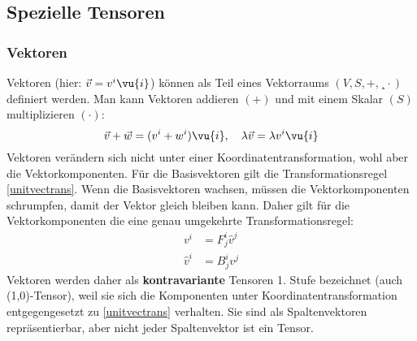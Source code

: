 	\subsection{Spezielle Tensoren}
	\subsubsection{Vektoren}
	Vektoren (hier: $\vec{v}=v^i\vu{i}$) können als Teil eines Vektorraums $(V,S,+,¸\cdot)$ definiert werden. Man kann Vektoren addieren $(+)$ und mit einem Skalar $(S)$ multiplizieren $(\cdot)$:
	\begin{equation}
		\vec{v}+\vec{w} = (v^i+w^i)\vu{i},\quad \lambda\vec{v} = \lambda v^i\vu{i}
	\end{equation}
	Vektoren verändern sich nicht unter einer Koordinatentransformation, wohl aber die Vektorkomponenten. Für die Basisvektoren gilt die Transformationsregel \ref{unitvectrans}. Wenn die Basisvektoren wachsen, müssen die Vektorkomponenten schrumpfen, damit der Vektor gleich bleiben kann. Daher gilt für die Vektorkomponenten die eine genau umgekehrte Transformationsregel:
	\begin{equation}\begin{split}
			v^i &=  F_j^i\hat{v}^j\\
			\hat{v}^i &= B_{j}^i v^j
	\end{split}\end{equation}
	Vektoren werden daher als \textbf{kontravariante} Tensoren 1. Stufe bezeichnet (auch (1,0)-Tensor), weil sie sich die Komponenten unter Koordinatentransformation entgegengesetzt zu \ref{unitvectrans} verhalten. Sie sind als Spaltenvektoren repräsentierbar, aber nicht jeder Spaltenvektor ist ein Tensor.
